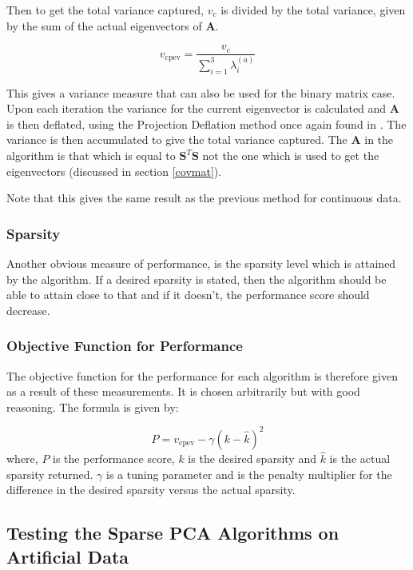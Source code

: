 \documentclass[11pt,a4paper]{article}
\newcommand{\smat}{\mathbf{S}}
\newcommand{\covmat}{\mathbf{A}}
\newcommand{\tp}{^T}
\begin{document}
Then to get the total variance captured, $v_c$ is divided by the total variance, given by the sum of the actual eigenvectors of $\covmat$.

\begin{equation*}
v_\text{cpev} = \frac{v_c}{\sum_{i=1}^3\lambda^{(a)}_i}
\end{equation*}

This gives a variance measure that can also be used for the binary matrix case. Upon each iteration the variance for the current eigenvector is calculated and $\covmat$ is then deflated, using the Projection Deflation method once again found in \cite{Mackey_deflationmethods}. The variance is then accumulated to give the total variance captured. The $\covmat$ in the algorithm is that which is equal to $\smat\tp\smat$ not the one which is used to get the eigenvectors (discussed in section \ref{covmat}).

Note that this gives the same result as the previous method for continuous data. 
\subsubsection{Sparsity}
Another obvious measure of performance, is the sparsity level which is attained by the algorithm. If a desired sparsity is stated, then the algorithm should be able to attain close to that and if it doesn't, the performance score should decrease. 

\subsubsection{Objective Function for Performance}
The objective function for the performance for each algorithm is therefore given as a result of these measurements. It is chosen arbitrarily but with good reasoning. The formula is given by:

\begin{equation}
P = v_\text{cpev} - \gamma \left(k - \hat{k}\right)^2
\label{obj_function}
\end{equation}
where, $P$ is the performance score, $k$ is the desired sparsity and $\hat{k}$ is the actual sparsity returned. $\gamma$ is a tuning parameter and is the penalty multiplier for the difference in the desired sparsity versus the actual sparsity. 







\subsection{Testing the Sparse PCA Algorithms on Artificial Data}\label{testing}
\end{document}
